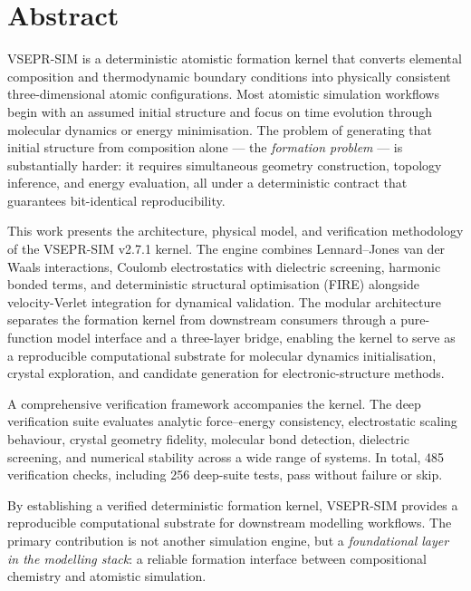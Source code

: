 \documentclass[11pt,twoside]{article}
\begin{document}
\tableofcontents
\newpage

\section{Abstract}
\label{sec:abstract}

VSEPR-SIM is a deterministic atomistic formation kernel that converts elemental composition and thermodynamic boundary conditions into physically consistent three-dimensional atomic configurations. Most atomistic simulation workflows begin with an assumed initial structure and focus on time evolution through molecular dynamics or energy minimisation. The problem of generating that initial structure from composition alone --- the \emph{formation problem} --- is substantially harder: it requires simultaneous geometry construction, topology inference, and energy evaluation, all under a deterministic contract that guarantees bit-identical reproducibility.

This work presents the architecture, physical model, and verification methodology of the VSEPR-SIM v2.7.1 kernel. The engine combines Lennard--Jones van der Waals interactions, Coulomb electrostatics with dielectric screening, harmonic bonded terms, and deterministic structural optimisation (FIRE) alongside velocity-Verlet integration for dynamical validation. The modular architecture separates the formation kernel from downstream consumers through a pure-function model interface and a three-layer bridge, enabling the kernel to serve as a reproducible computational substrate for molecular dynamics initialisation, crystal exploration, and candidate generation for electronic-structure methods.

A comprehensive verification framework accompanies the kernel. The deep verification suite evaluates analytic force--energy consistency, electrostatic scaling behaviour, crystal geometry fidelity, molecular bond detection, dielectric screening, and numerical stability across a wide range of systems. In total, 485 verification checks, including 256 deep-suite tests, pass without failure or skip.

By establishing a verified deterministic formation kernel, VSEPR-SIM provides a reproducible computational substrate for downstream modelling workflows. The primary contribution is not another simulation engine, but a \emph{foundational layer in the modelling stack}: a reliable formation interface between compositional chemistry and atomistic simulation.
\end{document}
